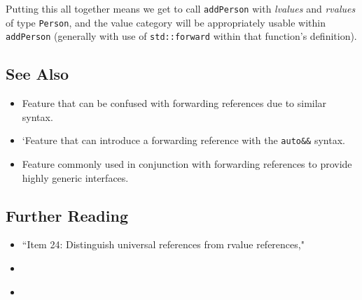 Putting this all together means we get to call \texttt{addPerson} with
\emph{lvalues} and \emph{rvalues} of type \texttt{Person}, and the value
category will be appropriately usable within \texttt{addPerson}
(generally with use of \texttt{std::forward} within that function's
definition).

\subsection[See Also]{See Also}\label{see-also}

\begin{itemize}
\item{Feature that can be confused with forwarding references due to similar syntax.}
\item{`Feature that can introduce a forwarding reference with the \texttt{auto\&\&} syntax.}
\item{Feature commonly used in conjunction with forwarding references to provide highly generic interfaces.}
\end{itemize}

\subsection[Further Reading]{Further Reading}\label{further-reading}

\begin{itemize}
\item{``Item 24: Distinguish universal references from rvalue references," \cite{meyers15}}
\item{\cite{sutter14}}
\item{\cite{niebler13}}
\end{itemize}


